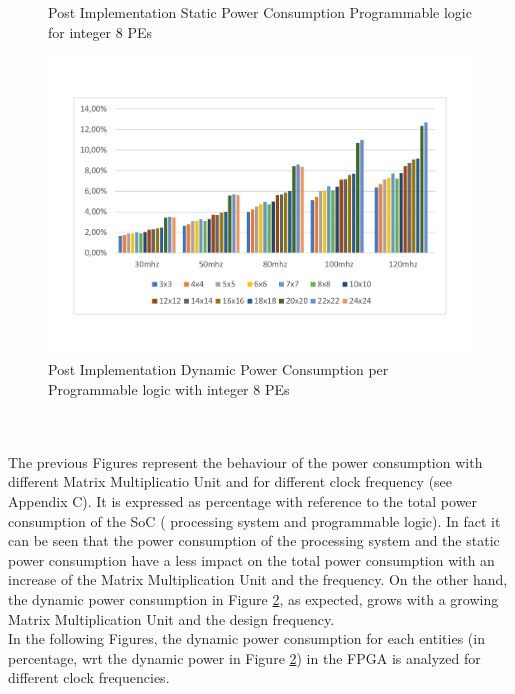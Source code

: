 \begin{itemize}
\begin{figure}[!htbp]
\caption{Post Implementation Static Power Consumption Programmable logic for integer 8 PEs }
\label{fig:staticpowint8}
\end{figure}
\begin{figure}[!htbp]
\centering
\captionsetup{justification=centering}
\includegraphics[scale=0.45,angle=0]{./figure/graphs/power_pldyn_int8_freq.pdf}
\caption{Post Implementation Dynamic Power Consumption per Programmable logic with integer 8 PEs}
\label{fig:dynpowint8}
\end{figure}\\\\
The previous Figures represent the behaviour of the power consumption with different Matrix Multiplicatio Unit and for different clock frequency (see Appendix C). It is expressed as percentage with reference to the total power consumption of the SoC ( processing system and programmable logic). In fact it can be seen that the power consumption of the processing system and the static power consumption have a less impact on the total power consumption with an increase of the Matrix Multiplication Unit and the frequency. On the other hand, the dynamic power consumption in Figure \ref{fig:dynpowint8}, as expected, grows with a growing Matrix Multiplication Unit and the design frequency.\\
In the following Figures, the dynamic power consumption for each entities (in percentage, wrt the dynamic power in Figure \ref{fig:dynpowint8}) in the FPGA is analyzed for different clock frequencies.\\
\begin{figure}[!htbp]
\centering
\captionsetup{justification=centering}

\end{figure}
\end{itemize}
